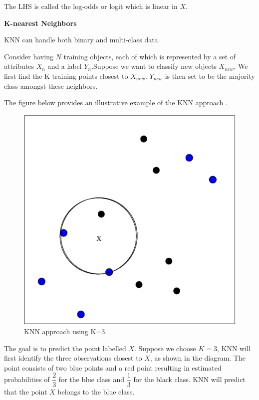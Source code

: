 The LHS is called the log-odds or logit which is linear in $X$.

\begin{center}
\textbf{K-nearest Neighbors}
\end{center}

KNN can handle both binary and multi-class data.

Consider having $N$ training objects, each of which is represented by a set of attributes $X_{n}$ and a label $Y_{n}$.Suppose we want to classify new objects $X_{new}$, We first find the K training points closest to $X_{new}$. $Y_{new}$ is then set to be the majority class amongst these neighbors.

The figure below provides an illustrative example of the KNN approach \citep{james2014introduction}.

\begin{figure}[hbtp]
\caption{KNN approach using K=3.}
\centering
\includegraphics[scale=0.4]{KNN.eps}
\end{figure}


The goal is to predict the point labelled $X$. Suppose we choose $K=3$, KNN will first identify the three observations closest to $X$, as shown in the diagram. The point consists of two blue points and a red point resulting in estimated probabilities of $\dfrac{2}{3}$ for the blue class and $\dfrac{1}{3}$ for the black class. KNN will predict that the point $X$ belongs to the blue class.

